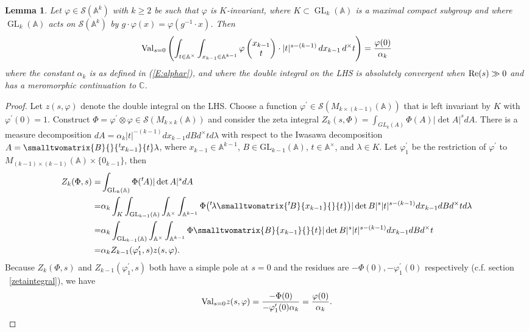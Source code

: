 \documentclass[10pt]{amsart}
\theoremstyle{plain}
\newtheorem{Lem}[equation]{Lemma}
\numberwithin{equation}{section}
\begin{document}
 \begin{Lem}
 Let $\varphi \in \mathcal{S}({\mathbb{A}}^k)$ with $k \geq 2$ be such that
 $\varphi$ is $K$-invariant, where $K \subset {\operatorname{GL}}_k({\mathbb{A}})$ is a maximal
 compact subgroup and where  ${\operatorname{GL}}_k({\mathbb{A}})$ acts on  $ \mathcal{S}({\mathbb{A}}^k)$ by $g \cdot \varphi(x)  = \varphi(g^{-1} \cdot x)$. Then
\[  
  {\rm Val}_{s=0} \left( 
\int_{t \in {\mathbb{A}}^{\times} }   \int_{x_{k-1} \in {\mathbb{A}}^{k-1}} \varphi   
\begin{pmatrix}
x_{k-1}  \\
 t  \end{pmatrix}\cdot  |t|^{s - (k-1)} \, dx_{k-1}  \,  d^{\times} t
\right) =   \frac{\varphi(0)}{\alpha_{k}} 
 \] 
 where the constant $\alpha_{k}$ is as defined in (\ref{E:alphar}),
 and where the double integral on the LHS is absolutely convergent
 when ${\rm Re}(s) \gg 0$ and has a meromorphic continuation to ${\mathbb C}$.
 \end{Lem}
 \begin{proof}
Let $z(s,\varphi)$ denote the double integral on the LHS. Choose a
function $\varphi^\prime\in \mathcal{S}(M_{k\times (k-1)}({\mathbb{A}}))$ that
is left invariant by $K$ with $\varphi^\prime(0)=1$. Construct
$\Phi=\varphi^\prime\otimes \varphi \in \mathcal{S}(M_{k\times
  k}({\mathbb{A}}))$ and consider the zeta integral
$Z_k(s,\Phi)=\int_{GL_k(A)}\Phi(A)|\det A|^sdA$. There is a measure
decomposition $dA=\alpha_k |t|^{-(k-1)}dx_{k-1}dB d^\times t d\lambda$
with respect to the Iwasawa decomposition
$A=\smalltwomatrix{B}{}{{{^{{t}}}\mspace{-2.5mu}{x_{k-1}}}}{t}\lambda$, where
$x_{k-1}\in {\mathbb{A}}^{k-1}$, $B\in \mathrm{GL}_{k-1}({\mathbb{A}})$, $t\in {\mathbb{A}}^\times$,
and $\lambda \in K$. Let $\varphi_1^\prime$ be the restriction of
$\varphi^\prime$ to $M_{(k-1)\times (k-1)}({\mathbb{A}})\times \{0_{k-1}\}$,
then
\begin{align*}
Z_k(\Phi,s)=&\int_{\mathrm{GL}_k({\mathbb{A}})}\Phi({{^{{t}}}\mspace{-2.5mu}{A}})|\det A|^sd A\\
=&\alpha_k \int_K \int_{\mathrm{GL}_{k-1}({\mathbb{A}})} \int_{{\mathbb{A}}^\times }\int_{{\mathbb{A}}^{k-1}}\Phi\big({{^{{t}}}\mspace{-2.5mu}{\lambda}}\smalltwomatrix{{{^{{t}}}\mspace{-2.5mu}{B}}}{x_{k-1}}{}{t}\big)|\det B|^s |t|^{s-(k-1)}dx_{k-1}d B d^\times t d\lambda\\
=&\alpha_k \int_{\mathrm{GL}_{k-1}({\mathbb{A}})} \int_{{\mathbb{A}}^\times } \int_{{\mathbb{A}}^{k-1}}\Phi\smalltwomatrix{B}{x_{k-1}}{}{t}|\det B|^s |t|^{s-(k-1)}dx_{k-1}d B d^\times t\\
=&\alpha_k Z_{k-1}(\varphi^\prime_1,s)z(s,\varphi).
\end{align*}
Because $Z_k(\Phi,s)$ and $Z_{k-1}(\varphi^\prime_1,s)$ both have a simple pole at $s=0$ and the residues are $-\Phi(0), -\varphi^\prime_1(0)$ respectively (c.f. section ~\ref{zetaintegral}), we have
\[
{\rm Val}_{s=0}z(s,\varphi)=\frac{-\Phi(0)}{-\varphi_1^\prime(0)\alpha_k }=\frac{\varphi(0)}{\alpha_k}.
\]

\end{proof}
 \vskip 10pt
 
\end{document}
